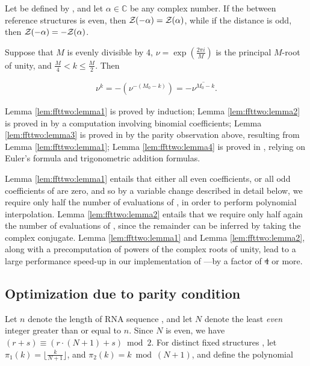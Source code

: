 \documentclass[11pt, oneside]{Thesis} %
\providecommand{\DIFadd}[1]{{\protect\color{blue}\uwave{#1}}} %
\providecommand{\DIFdel}[1]{{\protect\color{red}\sout{#1}}}                      %
\providecommand{\DIFaddbegin}{} %
\providecommand{\DIFaddend}{} %
\providecommand{\DIFdelbegin}{} %
\providecommand{\DIFdelend}{} %
\begin{document}
\begin{lemma}
\label{lem:ffttwo:lemma3}
Let \fullZx be defined by , and
let $\alpha \in \mathbb{C}$ be any complex number.
If the \bpd between reference
structures \strAB is even, then ${\mathcal Z}_{}(-\alpha) = {\mathcal Z}_{}(\alpha)$,
while if
the distance is odd, then ${\mathcal Z}_{}(-\alpha) = -{\mathcal Z}_{}(\alpha)$.
\end{lemma}

\begin{lemma}
\label{lem:ffttwo:lemma4}
Suppose that $M$ is evenly divisible by 4,
$\nu = \exp(\frac{2 \pi i}{M})$ is the principal $M$-root of unity, and
$\frac{M}{4} < k \leq \frac{M}{2}$. Then

\begin{align}
\nu^k = -(\nu^{-(M_0-k)}) = -\overline{\nu^{M_0-k}}.
\end{align}
\end{lemma}

Lemma \ref{lem:ffttwo:lemma1} is proved by induction;
Lemma \ref{lem:ffttwo:lemma2}
is proved in  by a computation involving
binomial coefficients;
Lemma \ref{lem:ffttwo:lemma3} is proved in 
by the parity observation above, resulting from Lemma \ref{lem:ffttwo:lemma1};
Lemma \ref{lem:ffttwo:lemma4} is proved in ,
relying on Euler's formula and trigonometric addition formulas.

Lemma \ref{lem:ffttwo:lemma1}
entails that either all even coefficients, or all odd coefficients
of \fullZx are zero, and so by a variable change described in detail below,
we require only half the number of evaluations of \fullZx, in order to perform
polynomial interpolation.
Lemma \ref{lem:ffttwo:lemma2}
entails that we require only half again the number of evaluations of
\fullZx, since the remainder can be inferred by taking the complex conjugate.
Lemma \ref{lem:ffttwo:lemma1} and Lemma \ref{lem:ffttwo:lemma2},
along with a
precomputation of powers of the complex roots of unity, lead to a
large performance speed-up in our implementation of \ffttwo---by a factor
of \DIFdelbegin \DIFdel{4 }\DIFdelend \DIFaddbegin \DIFadd{$4$ }\DIFaddend or more.

\subsection{Optimization due to parity condition}
\label{subsec:ffttwo:parity}

Let $n$ denote the length of RNA sequence \seq, and let $N$ denote the
least {\em even} integer greater than or equal to $n$. Since $N$ is even,
we have $(r+s) \equiv (r\cdot(N+1)+s) \bmod 2$. For distinct
fixed structures \strAB, let
$\pi_1(k) = \lfloor \frac{k}{N+1} \rfloor$, and
$\pi_2(k) = k \bmod (N+1)$, and define the polynomial
\end{document}
